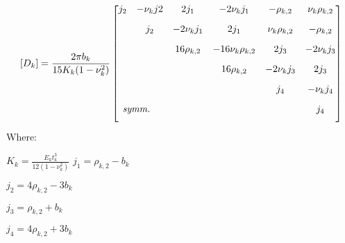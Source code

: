 \begin{equation}\label{eqn:flexMatrix}
  [D_k]=\frac{2\pi b_k}{15K_k(1-\nu_k^2)}
  \begin{bmatrix}
        j_2 & -\nu_kj2 & 2j_1 & -2\nu_kj_1 & -\rho_{k,2} & \nu_k\rho_{k,2} \\[2ex]
            & j_2 & -2\nu_kj_1 & 2j_1 & \nu_k\rho_{k,2} & -\rho_{k,2} \\[2ex]
            &  & 16\rho_{k,2} & -16\nu_k\rho_{k,2} & 2j_3 & -2\nu_kj_3 \\[2ex]
            &  &  & 16\rho_{k,2} & -2\nu_kj_3 & 2j_3 \\[2ex]
            &  &  &  & j_4 & -\nu_kj_4 \\[2ex]
      \rlap{\textit{symm.}} &  &  &  &  & j_4 \\[2ex]
    \end{bmatrix}
\end{equation}
Where:\par
$K_k=\frac{E_kt_k^3}{12(1-\nu_k^2)}$
$j_1=\rho_{k,2}-b_k$\par
$j_2=4\rho_{k,2}-3b_k$\par
$j_3=\rho_{k,2}+b_k$\par
$j_4=4\rho_{k,2}+3b_k$\par
{}

